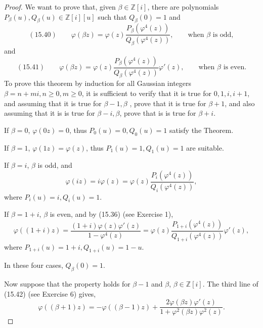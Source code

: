 \documentclass[11pt,a4paper]{article}
\newcommand{\Z}{\mathbb{Z}}
\begin{document}
\begin{proof} 
We want to prove that, given $\beta \in \Z[i]$, there are polynomials $P_\beta(u),Q_\beta(u) \in \Z[i][u]$ such that $Q_\beta(0) = 1$ and
$$
(15.40)\qquad \varphi(\beta z) = \varphi(z) \frac{P_\beta\left(\varphi^4(z)\right)}{Q_\beta\left(\varphi^4(z)\right)},\qquad \text{when } \beta \text{ is odd},
$$
and
$$
(15.41)\qquad \varphi(\beta z) = \varphi(z) \frac{P_\beta\left(\varphi^4(z)\right)}{Q_\beta\left(\varphi^4(z)\right)}\varphi'(z),\qquad \text{when } \beta \text{ is even}.
$$
To prove this theorem by induction for all Gaussian integers $\beta = n +mi, n\geq 0, m \geq 0$, it is sufficient to verify that it is true for $0,1,i,i+1$, and assuming that it is true for $\beta-1,\beta$ , prove that it is true for $\beta+1$, and also assuming that it is is true for $\beta -i,\beta$, prove that is is true for $\beta +i$.

If $\beta = 0$, $\varphi(0z) = 0$, thus $P_0(u) = 0, Q_0(u) = 1$ satisfy the Theorem.

If $\beta = 1$, $\varphi(1z) = \varphi(z)$, thus $P_1(u) = 1,Q_1(u) = 1$ are suitable.

If $\beta = i$, $\beta$ is odd, and
$$\varphi(iz) = i \varphi(z) = \varphi(z) \frac{P_i\left(\varphi^4(z)\right)}{Q_i\left(\varphi^4(z)\right)},$$
 where $P_i(u) = i,Q_i(u) = 1$.
 
If $\beta = 1+i$, $\beta$ is even, and by (15.36) (see Exercise 1),
$$\varphi((1+i)z) = \frac{(1+i)\varphi(z)\varphi'(z)}{1 - \varphi^4(z)} = \varphi(z) \frac{P_{1+i}\left(\varphi^4(z)\right)}{Q_{1+i}\left(\varphi^4(z)\right)} \varphi'(z),$$
 where $P_{1+i}(u) =1+ i,Q_{1+i}(u) = 1 -u$. 
 
 In these four cases, $Q_\beta(0) = 1$.
 
 Now suppose that the property holds for $\beta-1$ and $\beta$, $\beta \in \Z[i]$. The third line of (15.42) (see Exercise 6) gives, 
 $$\varphi((\beta +1)z) = -\varphi((\beta - 1)z) + \frac{2 \varphi(\beta z)\varphi'(z)}{1 + \varphi^2(\beta z) \varphi^2(z)}.$$
 

\end{proof}
\end{document}
